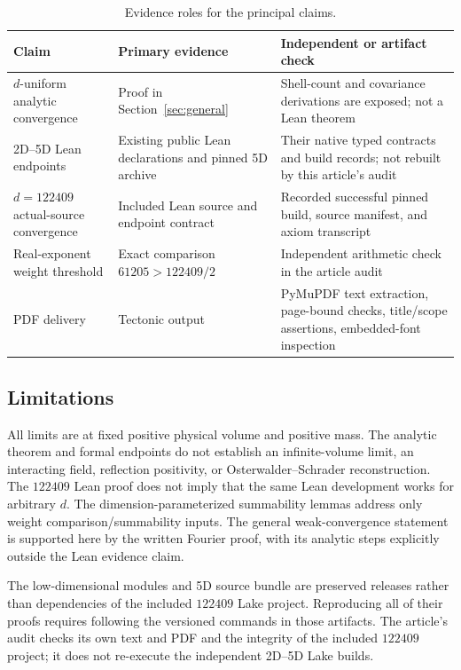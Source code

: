 \begin{table}[ht]
\centering\small
\caption{Evidence roles for the principal claims.}\label{tab:evidence}
\begin{tabular}{@{}p{}p{}p{}@{}}
\toprule
Claim & Primary evidence & Independent or artifact check\\
\midrule
$d$-uniform analytic convergence & Proof in Section~\ref{sec:general} & Shell-count and covariance derivations are exposed; not a Lean theorem\\
2D--5D Lean endpoints & Existing public Lean declarations and pinned 5D archive & Their native typed contracts and build records; not rebuilt by this article's audit\\
$d=122409$ actual-source convergence & Included Lean source and endpoint contract & Recorded successful pinned build, source manifest, and axiom transcript\\
Real-exponent weight threshold & Exact comparison $61205>122409/2$ & Independent arithmetic check in the article audit\\
PDF delivery & Tectonic output & PyMuPDF text extraction, page-bound checks, title/scope assertions, embedded-font inspection\\
\bottomrule
\end{tabular}
\end{table}

\subsection{Limitations}
All limits are at fixed positive physical volume and positive mass. The analytic theorem and formal endpoints do not establish an infinite-volume limit, an interacting field, reflection positivity, or Osterwalder--Schrader reconstruction. The $122409$ Lean proof does not imply that the same Lean development works for arbitrary $d$. The dimension-parameterized summability lemmas address only weight comparison/summability inputs. The general weak-convergence statement is supported here by the written Fourier proof, with its analytic steps explicitly outside the Lean evidence claim.

The low-dimensional modules and 5D source bundle are preserved releases rather than dependencies of the included $122409$ Lake project. Reproducing all of their proofs requires following the versioned commands in those artifacts. The article's audit checks its own text and PDF and the integrity of the included $122409$ project; it does not re-execute the independent 2D--5D Lake builds.

